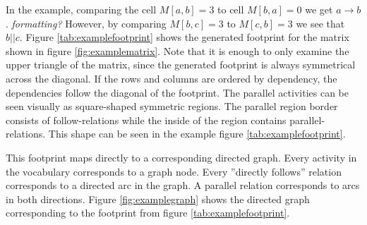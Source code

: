 \documentclass[english,12pt,a4paper,pdftex,sci,utf8]{aaltothesis}
\theoremstyle{definition}
\newcommand{\nyi}[1]{\noindent\colorbox{nyibg}{\textcolor{nyitext}{\emph{#1}}}}
\begin{document}
In the example, comparing the cell $M[a,b] = 3$ to cell $M[b,a] = 0$ we get $a \rightarrow b$. \nyi{formatting?}
However, by comparing $M[b,c] = 3$ to $M[c,b] = 3$ we see that $b || c$. 
Figure \ref{tab:examplefootprint} shows the generated footprint for the matrix shown in figure \ref{fig:examplematrix}.
Note that it is enough to only examine the upper triangle of the matrix, since the generated footprint is always symmetrical across the diagonal.
If the rows and columns are ordered by dependency, the dependencies follow the diagonal of the footprint.
The parallel activities can be seen visually as square-shaped symmetric regions.
The parallel region border consists of follow-relations while the inside of the region contains parallel-relations.
This shape can be seen in the example figure \ref{tab:examplefootprint}.

This footprint maps directly to a corresponding directed graph.
Every activity in the vocabulary corresponds to a graph node.
Every ''directly follows'' relation corresponds to a directed arc in the graph. A parallel relation corresponds to arcs in both directions.
Figure \ref{fig:examplegraph} shows the directed graph corresponding to the footprint from figure \ref{tab:examplefootprint}.
\end{document}
